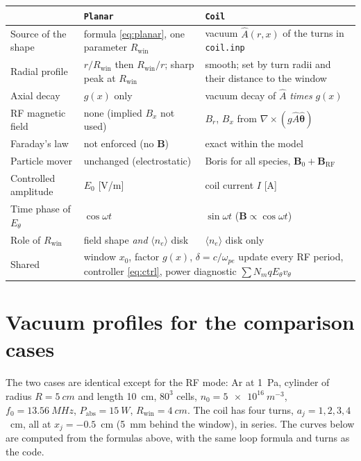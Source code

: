 \documentclass[11pt,a4paper]{article}
\newcommand{\rwin}{R_{\mathrm{win}}}
\newcommand{\Ahat}{\hat{A}}
\newcommand{\code}[1]{\texttt{#1}}
\begin{document}
\begin{center}
\renewcommand{\arraystretch}{1.25}
\begin{tabular}{@{}p{}p{}p{}@{}}
\toprule
 & \code{Planar} & \code{Coil} \\
\midrule
Source of the shape & formula \eqref{eq:planar}, one parameter $\rwin$
  & vacuum $\Ahat(r,x)$ of the turns in \code{coil.inp} \\
Radial profile & $r/\rwin$ then $\rwin/r$; sharp peak at $\rwin$
  & smooth; set by turn radii and their distance to the window \\
Axial decay & $g(x)$ only
  & vacuum decay of $\Ahat$ \emph{times} $g(x)$ \\
RF magnetic field & none (implied $B_x$ not used)
  & $B_r$, $B_x$ from $\nabla\times(g\Ahat\hat{\boldsymbol\theta})$ \\
Faraday's law & not enforced (no $\mathbf B$)
  & exact within the model \\
Particle mover & unchanged (electrostatic)
  & Boris for all species, $\mathbf B_0 + \mathbf B_{\mathrm{RF}}$ \\
Controlled amplitude & $E_0$ [\si{V/m}] & coil current $I$ [\si{A}] \\
Time phase of $E_\theta$ & $\cos\omega t$ & $\sin\omega t$ ($\mathbf B\propto\cos\omega t$) \\
Role of $\rwin$ & field shape \emph{and} $\langle n_e\rangle$ disk
  & $\langle n_e\rangle$ disk only \\
Shared & \multicolumn{2}{p{0.66\textwidth}}{window $x_0$, factor $g(x)$, $\delta = c/\omega_{pe}$ update every RF period,
  controller \eqref{eq:ctrl}, power diagnostic $\sum N_m q E_\theta v_\theta$} \\
\bottomrule
\end{tabular}
\end{center}

\section{Vacuum profiles for the comparison cases}

The two cases are identical except for the RF mode: Ar at \SI{1}{Pa},
cylinder of radius $R = \SI{5}{cm}$ and length \SI{10}{cm}, $80^3$ cells,
$n_0 = \SI{5e16}{m^{-3}}$, $f_0 = \SI{13.56}{MHz}$,
$P_{\mathrm{abs}} = \SI{15}{W}$, $\rwin = \SI{4}{cm}$. The coil has four
turns, $a_j = 1,2,3,4$~cm, all at $x_j = -0.5$~cm (\SI{5}{mm} behind the
window), in series. The curves below are computed from the formulas above,
with the same loop formula and turns as the code.
\end{document}
